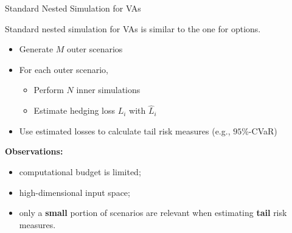 \documentclass[9pt,handout]{beamer}
\begin{document}
\begin{frame}{Standard Nested Simulation for VAs}

Standard nested simulation for VAs is similar to the one for options.

\begin{itemize}
    \item Generate $M$ outer scenarios
    \item For each outer scenario,
    \begin{itemize}
        \item Perform $N$ inner simulations
        \item Estimate hedging loss $L_i$ with $\hat{L}_i$
    \end{itemize}
    \item Use estimated losses to calculate tail risk measures (e.g., $95\%$-CVaR)
\end{itemize}

\vspace{10pt}

\textbf{Observations:}
\begin{itemize}
    \item computational budget is limited;
    \item high-dimensional input space;
    \item only a \textbf{small} portion of scenarios are relevant when estimating \textbf{tail} risk measures.
\end{itemize}

\end{frame}
\end{document}
